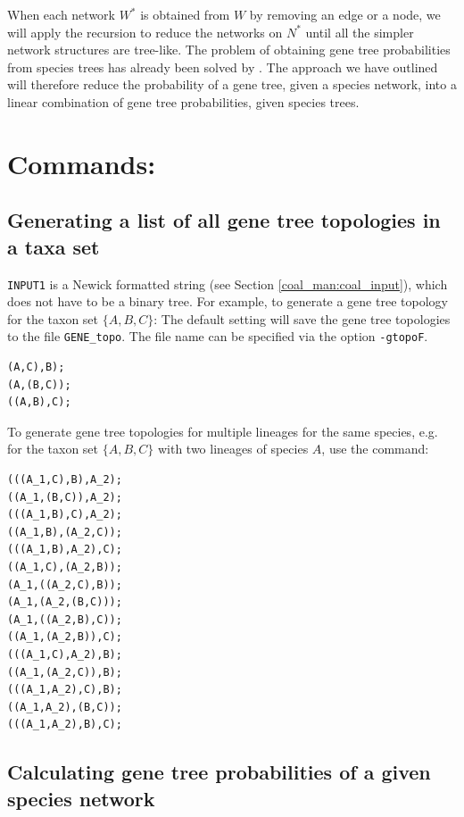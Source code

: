 When each network $W^*$ is obtained from $W$ by removing an edge or a node, we will apply the recursion to reduce the networks on $N^*$ until all the simpler network structures are tree-like. The problem of obtaining gene tree probabilities from species trees has already been solved by \cite{Degnan2005}. The approach we have outlined will therefore reduce the probability of a gene tree, given a species network, into a linear combination of gene tree probabilities, given species trees.


\section{Commands:}
\subsection{Generating a list of all gene tree topologies in a taxa set}
{\tt INPUT1} is a Newick formatted string (see Section \ref{coal_man:coal_input}), which does not have to be a binary tree. For example, to generate a gene tree topology for the taxon set $\{A,B,C\}$:
The default setting will save the gene tree topologies to the file {\tt GENE\_topo}. The file name can be specified via the option {\tt -gtopoF}.
\begin{verbatim}
(A,C),B);
(A,(B,C));
((A,B),C); 
\end{verbatim}

To generate gene tree topologies for multiple lineages for the same species, e.g. for the taxon set $\{A,B,C\}$ with two lineages of species $A$, use the command:
\begin{verbatim}
(((A_1,C),B),A_2);
((A_1,(B,C)),A_2);
(((A_1,B),C),A_2);
((A_1,B),(A_2,C));
(((A_1,B),A_2),C);
((A_1,C),(A_2,B));
(A_1,((A_2,C),B));
(A_1,(A_2,(B,C)));
(A_1,((A_2,B),C));
((A_1,(A_2,B)),C);
(((A_1,C),A_2),B);
((A_1,(A_2,C)),B);
(((A_1,A_2),C),B);
((A_1,A_2),(B,C));
(((A_1,A_2),B),C);
\end{verbatim}

\subsection{Calculating gene tree probabilities of a given species network}

